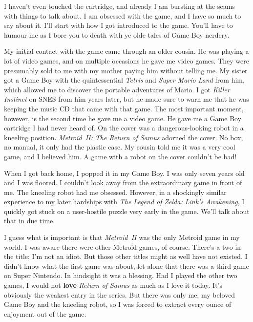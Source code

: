 \documentclass{book}
\begin{document}
I haven’t even touched the cartridge, and already I am bursting at the seams with things to talk about. I am obsessed with the game, and I have so much to say about it. I’ll start with how I got introduced to the game. You’ll have to humour me as I bore you to death with ye olde tales of Game Boy nerdery.\par
My initial contact with the game came through an older cousin. He was playing a lot of video games, and on multiple occasions he gave me video games. They were presumably sold to me with my mother paying him without telling me. My sister got a Game Boy with the quintessential \emph{Tetris} and \emph{Super Mario Land} from him, which allowed me to discover the portable adventures of Mario. I got \emph{Killer Instinct} on SNES from him years later, but he made sure to warn me that he was keeping the music CD that came with that game. The most important moment, however, is the second time he gave me a video game. He gave me a Game Boy cartridge I had never heard of. On the cover was a dangerous-looking robot in a kneeling position. \emph{Metroid~II: The Return of Samus} adorned the cover. No box, no manual, it only had the plastic case. My cousin told me it was a very cool game, and I believed him. A game with a robot on the cover couldn’t be bad!\par
When I got back home, I popped it in my Game Boy. I was only seven years old and I was floored. I couldn’t look away from the extraordinary game in front of me. The kneeling robot had me obsessed. However, in a shockingly similar experience to my later hardships with \emph{The Legend of Zelda: Link’s Awakening}, I quickly got stuck on a user-hostile puzzle very early in the game. We’ll talk about that in due time.\par
I guess what is important is that \emph{Metroid~II} was the only Metroid game in my world. I was aware there were other Metroid games, of course. There’s a two in the title; I’m not an idiot. But those other titles might as well have not existed. I didn’t know what the first game was about, let alone that there was a third game on Super Nintendo. In hindsight it was a blessing. Had I played the other two games, I would not \textbf{love} \emph{Return of Samus} as much as I love it today. It’s obviously the weakest entry in the series. But there was only me, my beloved Game Boy and the kneeling robot, so I was forced to extract every ounce of enjoyment out of the game.\par
\end{document}
